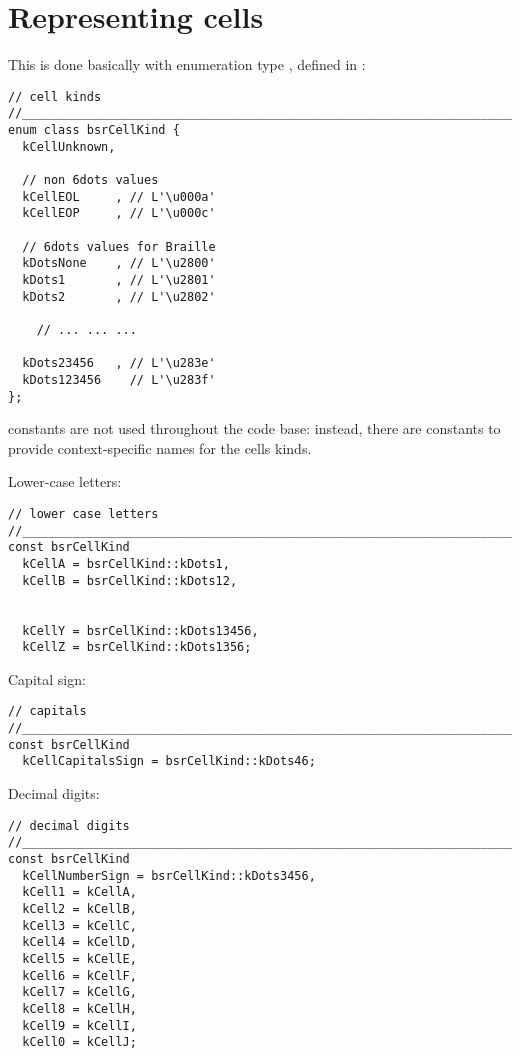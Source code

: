 \section{Representing cells}

This is done basically with enumeration type , defined in :
\begin{lstlisting}[language=CPlusPlus]
// cell kinds
//______________________________________________________________________________
enum class bsrCellKind {
  kCellUnknown,

  // non 6dots values
  kCellEOL     , // L'\u000a'
  kCellEOP     , // L'\u000c'

  // 6dots values for Braille
  kDotsNone    , // L'\u2800'
  kDots1       , // L'\u2801'
  kDots2       , // L'\u2802'

	// ... ... ...

  kDots23456   , // L'\u283e'
  kDots123456    // L'\u283f'
};

\end{lstlisting}

 constants are not used throughout the code base: instead, there are  constants to provide context-specific names for the cells kinds.

Lower-case letters:
\begin{lstlisting}[language=CPlusPlus]
// lower case letters
//______________________________________________________________________________
const bsrCellKind
  kCellA = bsrCellKind::kDots1,
  kCellB = bsrCellKind::kDots12,


  kCellY = bsrCellKind::kDots13456,
  kCellZ = bsrCellKind::kDots1356;
\end{lstlisting}

Capital sign:
\begin{lstlisting}[language=CPlusPlus]
// capitals
//______________________________________________________________________________
const bsrCellKind
  kCellCapitalsSign = bsrCellKind::kDots46;
\end{lstlisting}

Decimal digits:
\begin{lstlisting}[language=CPlusPlus]
// decimal digits
//______________________________________________________________________________
const bsrCellKind
  kCellNumberSign = bsrCellKind::kDots3456,
  kCell1 = kCellA,
  kCell2 = kCellB,
  kCell3 = kCellC,
  kCell4 = kCellD,
  kCell5 = kCellE,
  kCell6 = kCellF,
  kCell7 = kCellG,
  kCell8 = kCellH,
  kCell9 = kCellI,
  kCell0 = kCellJ;
\end{lstlisting}

